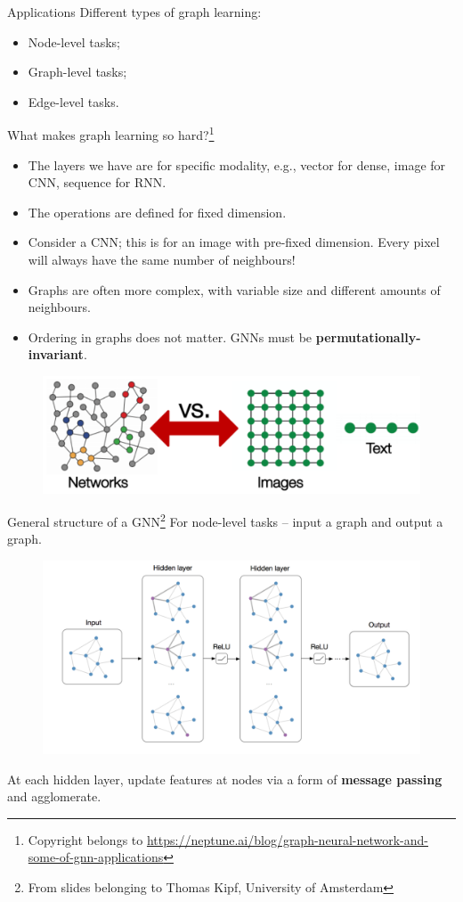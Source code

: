 \documentclass{beamer}
\begin{document}
\begin{frame}{Applications}
Different types of graph learning:
\begin{itemize}
\item Node-level tasks;
\item Graph-level tasks;
\item Edge-level tasks.
\end{itemize} 
\end{frame}
\begin{frame}{What makes graph learning so hard?\footnote{Copyright belongs to \url{https://neptune.ai/blog/graph-neural-network-and-some-of-gnn-applications}}}

\begin{itemize}
\item The layers we have are for specific modality, e.g., vector for dense, image for CNN, sequence for RNN.
\item The operations are defined for fixed dimension.
\item Consider a CNN; this is  for an image with pre-fixed dimension. Every pixel will always have the same number of neighbours!
\item Graphs are often more complex, with variable size and different amounts of neighbours.
\item Ordering in graphs does not matter. GNNs must be \textbf{permutationally-invariant}.
\end{itemize}
\begin{figure}
\includegraphics[width=0.5\linewidth]{Images/graph-neural-network.png}
\end{figure}
\end{frame}
\begin{frame}{General structure of a GNN\footnote{From slides belonging to Thomas Kipf, University of Amsterdam}}
For node-level tasks -- input a graph and output a graph.
\begin{figure}
\includegraphics[width=0.8\linewidth]{Images/GNN_structure.png}
\end{figure}
At each hidden layer, update features at nodes via a form of \textbf{message passing} and agglomerate.
\end{frame}
\end{document}
